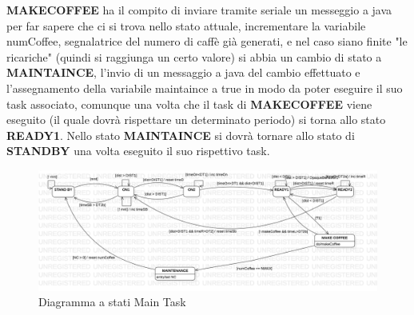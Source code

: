 \documentclass[a4paper]{article}
\begin{document}
\begin{itemize}
\textbf{MAKECOFFEE} ha il compito di inviare tramite seriale un messeggio a java per far sapere che ci si trova nello stato attuale, incrementare la variabile numCoffee, segnalatrice del numero di caffè già generati, e nel caso siano finite "le ricariche" (quindi si raggiunga un certo valore) si abbia un cambio di stato a \textbf{MAINTAINCE}, l'invio di un messaggio a java del cambio effettuato e l'assegnamento della variabile maintaince a true in modo da poter eseguire il suo task associato, comunque una volta che il task di \textbf{MAKECOFFEE} viene eseguito (il quale dovrà rispettare un determinato periodo) si torna allo stato \textbf{READY1}.
Nello stato \textbf{MAINTAINCE} si dovrà tornare allo stato di \textbf{STANDBY} una volta eseguito il suo rispettivo task.

\begin{figure}[h!]
	\includegraphics[scale = 0.30]{MainTask.png}
	\caption{Diagramma a stati Main Task}
\end{figure}
\end{itemize}

\newpage
\end{document}
